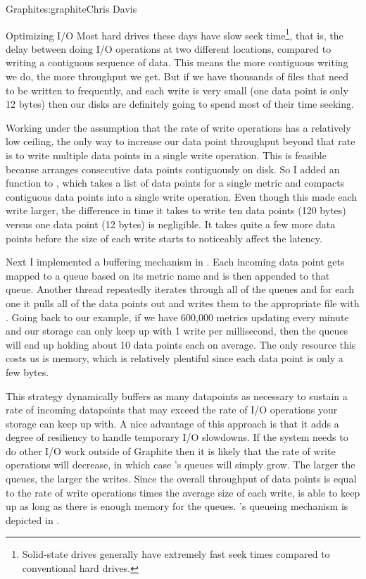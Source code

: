 \begin{aosachapter}{Graphite}{s:graphite}{Chris Davis}
\begin{aosasect1}{Optimizing I/O}
Most hard drives these days have slow seek time\footnote{Solid-state
drives generally have extremely fast seek times compared to
conventional hard drives.}, that is, the delay between doing I/O
operations at two different locations, compared to writing a
contiguous sequence of data. This means the more contiguous writing we
do, the more throughput we get. But if we have thousands of files that
need to be written to frequently, and each write is very small (one
 data point is only 12 bytes) then our disks are definitely
going to spend most of their time seeking.

Working under the assumption that the rate of write operations has a
relatively low ceiling, the only way to increase our data point
throughput beyond that rate is to write multiple data points in a
single write operation. This is feasible because  arranges
consecutive data points contiguously on disk. So I added an
 function to , which takes a list of data
points for a single metric and compacts contiguous data points into a
single write operation.  Even though this made each write larger, the
difference in time it takes to write ten data points (120 bytes)
versus one data point (12 bytes) is negligible. It takes quite a few
more data points before the size of each write starts to noticeably
affect the latency.

Next I implemented a buffering mechanism in . Each incoming data
point gets mapped to a queue based on its metric name and is then
appended to that queue.  Another thread repeatedly iterates through
all of the queues and for each one it pulls all of the data points out
and writes them to the appropriate  file with
. Going back to our example, if we have 600,000
metrics updating every minute and our storage can only keep up with 1
write per millisecond, then the queues will end up holding about 10
data points each on average. The only resource this costs us is
memory, which is relatively plentiful since each data point is only a
few bytes.

This strategy dynamically buffers as many datapoints as necessary to sustain
a rate of incoming datapoints that may exceed the rate of I/O operations your
storage can keep up with. A nice advantage of this approach is that it adds a degree of
resiliency to handle temporary I/O slowdowns. If the system needs to
do other I/O work outside of Graphite then it is likely that the rate
of write operations will decrease, in which case 's queues will
simply grow. The larger the queues, the larger the writes. Since the
overall throughput of data points is equal to the rate of write
operations times the average size of each write,  is able to
keep up as long as there is enough memory for the queues.  's
queueing mechanism is depicted in .


\end{aosasect1}
\end{aosachapter}
